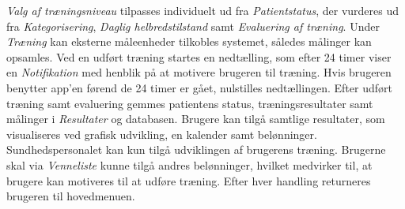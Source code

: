 \textit{Valg af træningsniveau} tilpasses individuelt ud fra \textit{Patientstatus}, der vurderes ud fra \textit{Kategorisering}, \textit{Daglig helbredstilstand} samt \textit{Evaluering af træning}.
Under \textit{Træning} kan eksterne måleenheder tilkobles systemet, således målinger kan opsamles. Ved en udført træning startes en nedtælling, som efter 24 timer viser en \textit{Notifikation} med henblik på at motivere brugeren til træning. Hvis brugeren benytter app'en førend de 24 timer er gået, nulstilles nedtællingen.
Efter udført træning samt evaluering gemmes patientens status, træningsresultater samt målinger i \textit{Resultater} og databasen. 
Brugere kan tilgå samtlige resultater, som visualiseres ved grafisk udvikling, en kalender samt belønninger. Sundhedspersonalet kan kun tilgå udviklingen af brugerens træning. Brugerne skal via \textit{Venneliste} kunne tilgå andres belønninger, hvilket medvirker til, at brugere kan motiveres til at udføre træning. Efter hver handling returneres brugeren til hovedmenuen.